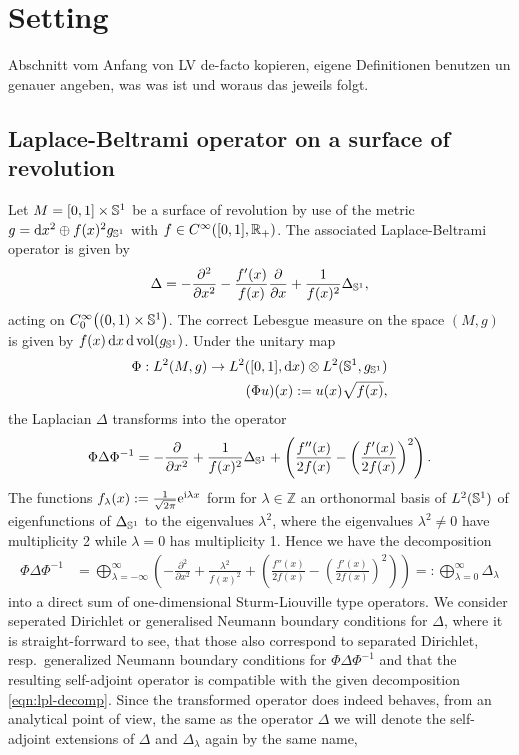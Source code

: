 \section{Setting}
Abschnitt vom Anfang von LV de-facto kopieren, eigene Definitionen benutzen un
genauer angeben, was was ist und woraus das jeweils folgt.

\subsection{Laplace-Beltrami operator on a surface of revolution}
Let $M = [0,1]\times\Sphere{1}$ be a surface of revolution by use of the metric
$g = \mathrm dx^2 \oplus f(x)^2 g_\Sphere{1}$ with $f\in \Cinf([0,1],
\Rplus)$. The associated Laplace-Beltrami operator is given by
\begin{align}
  \Delta = -\frac{\partial^2}{\partial x^2} -
            \frac{f'(x)}{f(x)}\frac{\partial}{\partial x} +
            \frac{1}{f(x)^2}\Delta_\Sphere1,
\end{align}
acting on $\Cinf[0]\bigl((0,1)\times\Sphere1\bigr)$. The correct Lebesgue
measure on the space $(M,g)$ is given by $f(x)\,\mathrm dx\, \mathrm
d\vol(g_\Sphere1)$. Under the unitary map
\begin{align*}
  \Phi: L^2(M, g)\to L^2([0,1], \mathrm dx)\otimes L^2(\Sphere1, g_\Sphere1) \\
  (\Phi u)(x) := u(x) \sqrt{f(x)},
\end{align*}
the Laplacian $\Delta$ transforms into the operator
\begin{align*}
  \Phi\Delta\Phi^{-1} = -\frac{\partial}{\partial x^2} +
  \frac{1}{f(x)^2}\Delta_\Sphere1 + \left( \frac{f''(x)}{2f(x)} -
  \left(\frac{f'(x)}{2f(x)}\right)^2\right).
\end{align*}
The functions $f_\lambda(x) := \frac{1}{\sqrt{2\pi}}\Eto{\mathrm i\lambda x}$
form for $\lambda\in\mathbb{Z}$ an orthonormal basis of $L^2(\Sphere1)$ of
eigenfunctions of $\Delta_\Sphere1$ to the eigenvalues $\lambda^2$, where the
eigenvalues $\lambda^2 \neq 0$ have multiplicity 2 while $\lambda = 0$ has
multiplicity 1. Hence we have the decomposition
\begin{align}
  \label{eqn:lpl-decomp}
  \Phi\Delta\Phi^{-1} &= \bigoplus_{\lambda=-\infty}^{\infty} \left(
    -\frac{\partial^2}{\partial x^2} + \frac{\lambda^2}{f(x)^2} + 
     \left( \frac{f''(x)}{2f(x)} -
     \left(\frac{f'(x)}{2f(x)}\right)^2\right)\right)
     =: \bigoplus_{\lambda=0}^{\infty}\Delta_\lambda
\end{align}
into a direct sum of one-dimensional Sturm-Liouville type operators. We consider
seperated Dirichlet or generalised Neumann boundary conditions for $\Delta$,
where it is straight-forrward to see, that those also correspond to separated
Dirichlet, resp.\ generalized Neumann boundary conditions for
$\Phi\Delta\Phi^{-1}$ and that the resulting self-adjoint operator is compatible
with the given decomposition \eqref{eqn:lpl-decomp}. Since the transformed
operator does indeed behaves, from an analytical point of view, the same as the
operator $\Delta$ we will denote the self-adjoint extensions of $\Delta$ and
$\Delta_\lambda$ again by the same name, %


